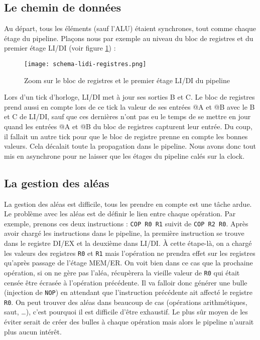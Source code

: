 \subsection{Le chemin de données}

Au départ, tous les éléments (sauf l’ALU) étaient synchrones, tout comme chaque étage du pipeline. Plaçons nous par exemple au niveau du bloc de registres et du premier étage LI/DI (voir figure \ref{schema-lidi-registres}) :

\begin{figure}[!h]
    \centering
    \texttt{[image: schema-lidi-registres.png]}
    \caption{Zoom sur le bloc de registres et le premier étage LI/DI du pipeline}
    \label{schema-lidi-registres}
\end{figure}

Lors d’un tick d'horloge, LI/DI met à jour ses sorties B et C. Le bloc de registres prend aussi en compte lors de ce tick la valeur de ses entrées @A et @B avec le B et C de LI/DI, sauf que ces dernières n’ont pas eu le temps de se mettre en jour quand les entrées @A et @B du bloc de registres capturent leur entrée. Du coup, il fallait un autre tick pour que le bloc de registre prenne en compte les bonnes valeurs. Cela décalait toute la propagation dans le pipeline. Nous avons donc tout mis en asynchrone pour ne laisser que les étages du pipeline calés sur la clock.

\subsection{La gestion des aléas}

La gestion des aléas est difficile, tous les prendre en compte est une tâche ardue. Le problème avec les aléas est de définir le lien entre chaque opération. Par exemple, prenons ces deux instructions : \texttt{COP R0 R1} suivit de \texttt{COP R2 R0}. Après avoir chargé les instructions dans le pipeline, la première instruction se trouve dans le registre DI/EX et la deuxième dans LI/DI. À cette étape-là, on a chargé les valeurs des registres \texttt{R0} et \texttt{R1} mais l'opération ne prendra effet sur les registres qu'après passage de l'étage MEM/ER. On voit bien dans ce cas que la prochaine opération, si on ne gère pas l'aléa, récupèrera la vieille valeur de \texttt{R0} qui était censée être écrasée à l'opération précédente. Il va falloir donc générer une bulle (injection de \texttt{NOP}) en attendant que l'instruction précédente ait affecté le registre \texttt{R0}. On peut trouver des aléas dans beaucoup de cas (opérations arithmétiques, saut, \ldots), c'est pourquoi il est difficile d'être exhaustif. Le plus sûr moyen de les éviter serait de créer des bulles à chaque opération mais alors le pipeline n'aurait plus aucun intérêt.\\

